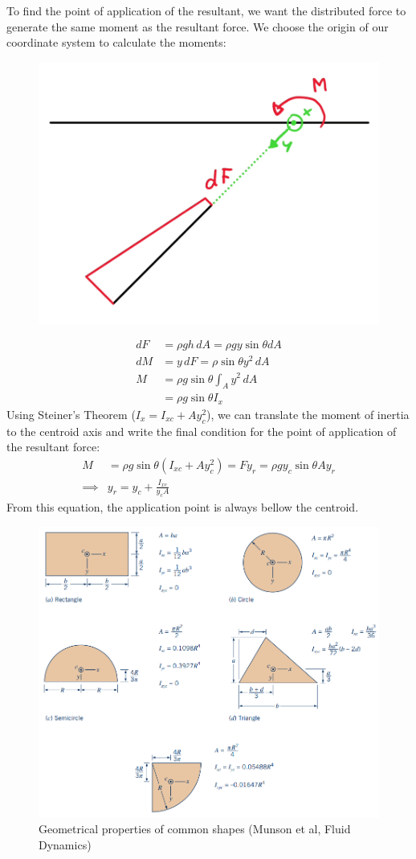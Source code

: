 To find the point of application of the resultant, we want the distributed force to generate the same moment as the resultant force. We choose the origin of our coordinate system to calculate the moments:
\begin{figure}[H]
	\centering
	\includegraphics[width=0.5\linewidth]{Sketches/ForceOnFlatSurface_Moment}
	\caption{}
	\label{fig:forceonflatsurfacemoment}
\end{figure}

\begin{equation*}
	\begin{split}
	dF &= \rho gh\,dA = \rho g y\sin\theta dA\\ 
	dM &= y\,dF = \rho\sin\theta y^2\, dA\\
	 M &= \rho g\sin\theta \int_A y^2\, dA\\
	 &= \rho g\sin\theta I_x
	\end{split}
\end{equation*}
Using Steiner's Theorem ($I_x=I_{xc}+Ay_c^2$), we can translate the moment of inertia to the centroid axis and write the final condition for the point of application of the resultant force:
\begin{equation*}
	\begin{split}
		M &= \rho g \sin\theta (I_{xc}+Ay_c^2) = F y_r = \rho g y_c\sin\theta A y_r\\
		\implies &\boxed{y_r = y_c + \frac{I_{xc}}{y_c A }}
	\end{split}
\end{equation*}
From this equation, the application point is always bellow the centroid.


\begin{figure}[H]
	\centering
	\includegraphics[width=0.7\linewidth]{Sketches/GeometricalPropertiesShapes}
	\caption{Geometrical properties of common shapes (Munson et al, Fluid Dynamics)}
	\label{fig:geometricalpropertiesshapes}
\end{figure}

